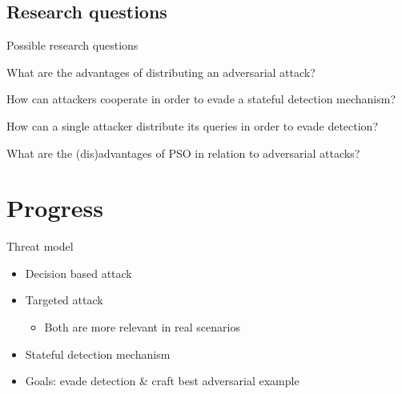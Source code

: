 \documentclass[11pt,t]{beamer}
\begin{document}
\subsection{Research questions}
\begin{frame}{Possible research questions}
\begin{exampleblock}
	{What are the advantages of distributing an adversarial attack?}
	\end{exampleblock}
	
	\begin{exampleblock}
	{How can attackers cooperate in order to evade a stateful detection mechanism?}
	\end{exampleblock}
	
	\begin{exampleblock}
	{How can a single attacker distribute its queries in order to evade detection?}
	\end{exampleblock}
	
	\begin{exampleblock}
	{What are the (dis)advantages of PSO in relation to adversarial attacks?}
	\end{exampleblock}
\end{frame}


\section{Progress}
\begin{frame}{Threat model}
\begin{itemize}
	\item Decision based attack
	\item Targeted attack
	\begin{itemize}
		\item Both are more relevant in real scenarios
	\end{itemize}
	\item Stateful detection mechanism
	\item Goals: evade detection \& craft best adversarial example	
\end{itemize}
\end{frame}
\end{document}

